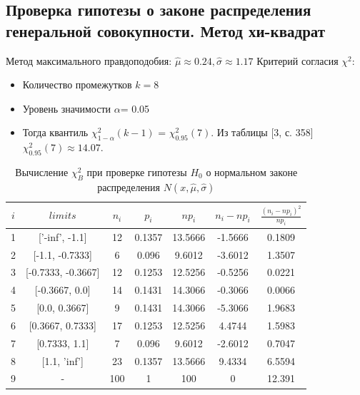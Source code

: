 \documentclass[../main.tex]{subfiles}
\begin{document}
		
    \subsection{Проверка гипотезы о законе распределения генеральной совокупности. Метод хи-квадрат}
    
    \noindent Метод максимального правдоподобия:
    \newline
    $\hat{\mu} \approx 0.24, \hat{\sigma} \approx 1.17$
    \newline Критерий согласия $\chi^{2}$:
    \begin{itemize}
        \item Количество промежутков $k = 8$
        \item Уровень значимости $\alpha$= 0.05
        \item Тогда квантиль $\chi^{2}_{1-\alpha}(k-1)$ = $\chi^{2}_{0.95}(7)$. Из таблицы [3, с. 358] $\chi^{2}_{0.95}(7) \approx 14.07$.
    \end{itemize}

    \newline
 
    \begin{table}[H]
    	\centering
    	\begin{tabular}{| c | c | c | c | c | c | c |}
    		\hline
    		$i$ & $limits$         &   $n_i$ &    $p_i$ &   $np_i$ &   $n_i - np_i$ &   $\frac{(n_i-np_i)^2}{np_i}$ \\
            \hline
                1 & ['-inf', -1.1]     &  12 & 0.1357 &  13.5666 & -1.5666 &  0.1809 \\
                2 & [-1.1, -0.7333]    &   6 & 0.096  &   9.6012 & -3.6012 &  1.3507 \\
                3 & [-0.7333, -0.3667] &  12 & 0.1253 &  12.5256 & -0.5256 &  0.0221 \\
                4 & [-0.3667, 0.0]     &  14 & 0.1431 &  14.3066 & -0.3066 &  0.0066 \\
                5 & [0.0, 0.3667]      &   9 & 0.1431 &  14.3066 & -5.3066 &  1.9683 \\
                6 & [0.3667, 0.7333]   &  17 & 0.1253 &  12.5256 &  4.4744 &  1.5983 \\
                7 & [0.7333, 1.1]      &   7 & 0.096  &   9.6012 & -2.6012 &  0.7047 \\
                8 & [1.1, 'inf']       &  23 & 0.1357 &  13.5666 &  9.4334 &  6.5594 \\
                9 & -                  & 100 & 1      & 100      &  0      & 12.391  \\
            \hline
    	\end{tabular}
    	\caption{ Вычисление $\chi^{2}_{B}$ при проверке гипотезы $H_{0}$ о нормальном законе распределения $N(x,\hat{\mu}, \hat{\sigma})$}
    	\label{tab:normal_chi_2}
    \end{table} 
    
\end{document}

